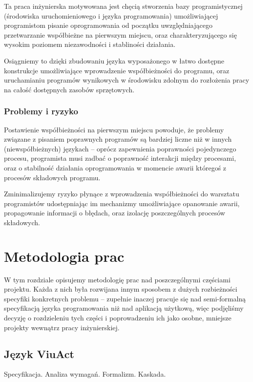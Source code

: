 \documentclass[11pt,oneside,a4paper,titlepage,onecolumn]{book}
\begin{document}
Ta praca inżynierska motywowana jest chęcią stworzenia bazy programistycznej (środowiska uruchomieniowego i
języka programowania) umożliwiającej programistom pisanie oprogramowania od początku uwzględniającego
przetwarzanie współbieżne na pierwszym miejscu, oraz charakteryzującego się wysokim poziomem niezawodności i
stabliności działania.

Osiągniemy to dzięki zbudowaniu języka wyposażonego w łatwo dostępne konstrukcje umożliwiające wprowadzenie
współbieżności do programu, oraz uruchamianiu programów wynikowych w środowisku zdolnym do rozłożenia pracy na
całość dostępnych zasobów sprzętowych.

\subsection{Problemy i ryzyko}

Postawienie współbieżności na pierwszym miejscu powoduje, że problemy związane z pisaniem poprawnych programów
są bardziej liczne niż w innych (niewspółbieżnych) językach -- oprócz zapewnienia poprawności pojedynczego
procesu, programista musi zadbać o poprawność interakcji między procesami, oraz o stabilność działania
oprogramowania w momencie awarii któregoś z procesów składowych programu.

Zminimalizujemy ryzyko płynące z wprowadzenia współbieżności do warsztatu programistów udostępniając im
mechanizmy umożliwiające opanowanie awarii, propagowanie informacji o błędach, oraz izolację poszczególnych
procesów składowych.

\chapter{Metodologia prac}

W tym rozdziale opisujemy metodologię prac nad poszczególnymi częściami projektu. Każda z nich była rozwijana
innym sposobem z dużych rozbieżności specyfiki konkretnych problemu -- zupełnie inaczej pracuje się nad
semi-formalną specyfikacją języka programowania niż nad aplikacją użytkową, więc podjęliśmy decyzję o
rozdzieleniu tych części i poprowadzeniu ich jako osobne, mniejsze projekty wewnątrz pracy inżynierskiej.

\section{Język ViuAct}

Specyfikacja. Analiza wymagań. Formalizm. Kaskada.
\end{document}
